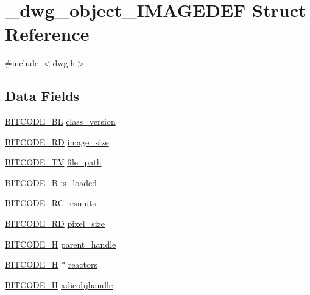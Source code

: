 \hypertarget{struct__dwg__object__IMAGEDEF}{\section{\-\_\-dwg\-\_\-object\-\_\-\-I\-M\-A\-G\-E\-D\-E\-F \-Struct \-Reference}
\label{struct__dwg__object__IMAGEDEF}
}


{\ttfamily \#include $<$dwg.\-h$>$}

\subsection*{\-Data \-Fields}
\begin{DoxyCompactItemize}
\item 
\hyperlink{dwg_8h_aebd5f127038868cbabc3d55d91da776c}{\-B\-I\-T\-C\-O\-D\-E\-\_\-\-B\-L} \hyperlink{struct__dwg__object__IMAGEDEF_a7a5d3d4929357810e5c0be6e0c98efa2}{class\-\_\-version}
\item 
\hyperlink{dwg_8h_a1d23a9bc9a02453876b244dc6706f6a6}{\-B\-I\-T\-C\-O\-D\-E\-\_\-R\-D} \hyperlink{struct__dwg__object__IMAGEDEF_a876fddf0f1a510ab606c23d7d4ce1029}{image\-\_\-size}
\item 
\hyperlink{dwg_8h_a2a7e040c6e36ca039b03608679ecaf7c}{\-B\-I\-T\-C\-O\-D\-E\-\_\-\-T\-V} \hyperlink{struct__dwg__object__IMAGEDEF_a025285ceee712fe490dfe4509c1fd675}{file\-\_\-path}
\item 
\hyperlink{dwg_8h_ab533b1f62d9086749e3bb5b67e9f224e}{\-B\-I\-T\-C\-O\-D\-E\-\_\-\-B} \hyperlink{struct__dwg__object__IMAGEDEF_af14e0d5d8391efd0c83f716c154a38dc}{is\-\_\-loaded}
\item 
\hyperlink{dwg_8h_a7fd199a8f9c9cc52bdab220f65a2a619}{\-B\-I\-T\-C\-O\-D\-E\-\_\-\-R\-C} \hyperlink{struct__dwg__object__IMAGEDEF_acdf026b62256b61b9c133b68221f6597}{resunits}
\item 
\hyperlink{dwg_8h_a1d23a9bc9a02453876b244dc6706f6a6}{\-B\-I\-T\-C\-O\-D\-E\-\_\-R\-D} \hyperlink{struct__dwg__object__IMAGEDEF_a3aadb45ed7e93f4aef47974be68d2ee0}{pixel\-\_\-size}
\item 
\hyperlink{dwg_8h_a7c700e94e047a97ba8c24bdfe4029dc3}{\-B\-I\-T\-C\-O\-D\-E\-\_\-\-H} \hyperlink{struct__dwg__object__IMAGEDEF_a888d4dbcf600c2c1a583f98ca7233ad1}{parent\-\_\-handle}
\item 
\hyperlink{dwg_8h_a7c700e94e047a97ba8c24bdfe4029dc3}{\-B\-I\-T\-C\-O\-D\-E\-\_\-\-H} $\ast$ \hyperlink{struct__dwg__object__IMAGEDEF_a96f517b7e277e9e124911e4ded2d3086}{reactors}
\item 
\hyperlink{dwg_8h_a7c700e94e047a97ba8c24bdfe4029dc3}{\-B\-I\-T\-C\-O\-D\-E\-\_\-\-H} \hyperlink{struct__dwg__object__IMAGEDEF_adcb94007de1e1bd035f19fb7a674af68}{xdicobjhandle}
\end{DoxyCompactItemize}


